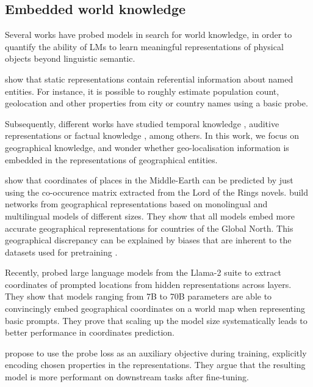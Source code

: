 \subsection{Embedded world knowledge}


Several works have probed models in search for world knowledge, in order to quantify the ability of LMs to learn meaningful representations of physical objects beyond linguistic semantic.

\citet{gupta-etal-2015-distributional} show that static representations contain referential information about named entities. For instance, it is possible to roughly estimate population count, geolocation and other properties from city or country names using a basic probe.

Subsequently, different works have studied temporal knowledge \citep{thukral-etal-2021-probing, caselli-etal-2022-time}, auditive representations \citep{ngo2024languagemodelshearprobing} or factual knowledge \citep{youssef-etal-2023-give}, among others. In this work, we focus on geographical knowledge, and wonder whether geo-localisation information is embedded in the representations of geographical entities.

\citet{lotr} show that coordinates of places in the Middle-Earth can be predicted by just using the co-occurence matrix extracted from the Lord of the Rings novels. \citet{faisal-anastasopoulos-2022-geographic} build networks from geographical representations based on monolingual and multilingual models of different sizes. They show that all models embed more accurate geographical representations for countries of the Global North. This geographical discrepancy can be explained by biases that are inherent to the datasets used for pretraining \citet{faisal-etal-2022-dataset}.

Recently, \citet{gurnee2023language} probed large language models from the Llama-2 suite \citep{touvron2023llama} to extract coordinates of prompted locations from hidden representations across layers. They show that models ranging from 7B to 70B parameters are able to convincingly embed geographical coordinates on a world map when representing basic prompts. They prove that scaling up the model size systematically leads to better performance in coordinates prediction.

\citet{peters-etal-2019-knowledge} propose to use the probe loss as an auxiliary objective during training, explicitly encoding chosen properties in the representations. They argue that the resulting model is more performant on downstream tasks after fine-tuning.

